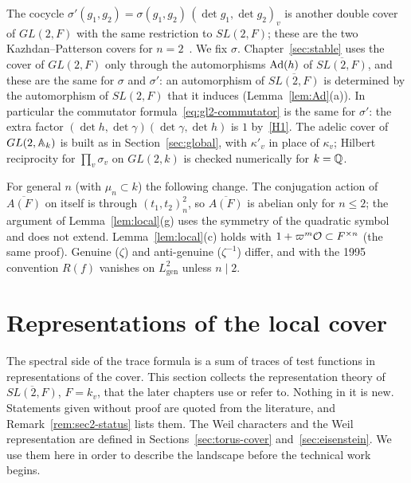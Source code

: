\begin{remarkrev}\label{rem:gl2-twist}
The cocycle $\sigma'(g_1,g_2)=\sigma(g_1,g_2)\,(\det g_1,\det g_2)_v$ is
another double cover of $GL(2,F)$ with the same restriction to $SL(2,F)$;
these are the two Kazhdan--Patterson covers for $n=2$~\cite{KP84}. We fix
$\sigma$. Chapter~\ref{sec:stable} uses the cover of $GL(2,F)$ only
through the automorphisms $\operatorname{Ad}(h)$ of $\overline{SL(2,F)}$, and
these are the same for $\sigma$ and $\sigma'$: an automorphism of
$\overline{SL(2,F)}$ is determined by the automorphism of $SL(2,F)$ that
it induces (Lemma~\ref{lem:Ad}(a)). In particular the commutator
formula~\eqref{eq:gl2-commutator} is the same for $\sigma'$: the extra
factor $(\det h,\det\gamma)(\det\gamma,\det h)$ is $1$ by~\ref{H1}. The
adelic cover of $GL(2,\mathbb{A}_k)$ is built as in Section~\ref{sec:global},
with $\kappa'_v$ in place of $\kappa_v$; Hilbert reciprocity for
$\prod_v\sigma_v$ on $GL(2,k)$ is checked numerically for $k=\mathbb{Q}$.
\end{remarkrev}

\begin{remarkrev}\label{rem:general-n}
For general $n$ (with $\mu_n\subset k$) the following change. The
conjugation action of $\overline{A(F)}$ on itself is through
$(t_1,t_2)_n^2$, so $\overline{A(F)}$ is abelian only for $n\le2$; the
argument of Lemma~\ref{lem:local}(g) uses the symmetry of the quadratic
symbol and does not extend. Lemma~\ref{lem:local}(c) holds with
$1+\varpi^m\mathcal{O}\subset F^{\times n}$ (the same proof). Genuine
($\zeta$) and anti-genuine ($\zeta^{-1}$) differ, and with the 1995
convention $R(f)$ vanishes on $L^2_{\mathrm{gen}}$ unless $n\mid2$.
\end{remarkrev}

\section{Representations of the local cover}\label{sec:rep-local}

The spectral side of the trace formula is a sum of traces of test
functions in representations of the cover. This section collects the
representation theory of $\overline{SL(2,F)}$, $F=k_v$, that the later
chapters use or refer to. Nothing in it is new. Statements given without
proof are quoted from the literature, and Remark~\ref{rem:sec2-status}
lists them. The Weil characters and the Weil representation are defined
in Sections~\ref{sec:torus-cover} and~\ref{sec:eisenstein}. We use them
here in order to describe the landscape before the technical work
begins.

